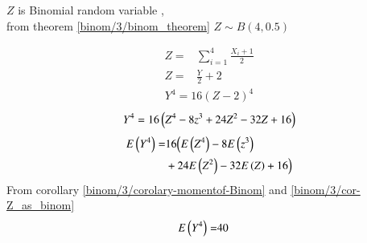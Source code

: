     \begin{corollary}
    $Z$  is Binomial random variable , \\from theorem \ref{binom/3/binom_theorem}
    {\centering
    ${\displaystyle Z \sim  {B} (4,0.5)}$
    }
    \label{binom/3/cor-Z_as_binom}
    \end{corollary}
    \begin{align}
    Z=&\sum_{i=1}^{4} \frac{X_i+1}{2}
    \\ Z=&\frac{Y}{2} + 2
    \end{align}
    \begin{align}
        {Y^4}=16{(Z-2)^4}
    \end{align}
    \begin{align}
        {Y^4}=16\left(Z^4-8z^3+24Z^2-32Z+16\right)
    \end{align}
    \begin{align}
    \begin{split}
        E\left(Y^4\right)=&16\Bigl(E\left(Z^4\right)-8E\left(z^3\right)
        \\&+24E\left(Z^2\right)-32E\left(Z\right)+16\Bigr)
    \end{split}    
    \end{align}
    From corollary \ref{binom/3/corolary-momentof-Binom} and  \ref{binom/3/cor-Z_as_binom}
    \begin{align}
        E\left(Y^4\right)=&40 &
    \end{align}
    